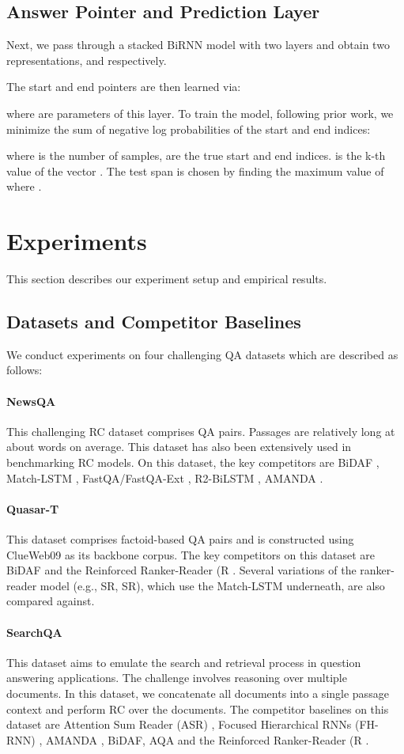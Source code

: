 \documentclass{article}
\begin{document}
\subsection{Answer Pointer and Prediction Layer}
Next, we pass  through a stacked BiRNN model with two layers and obtain two representations,  and  respectively.

The start and end pointers are then learned via:

where  are parameters of this layer.  To train the model, following prior work, we minimize the sum of negative log probabilities of the start and end indices:

where  is the number of samples,  are the true start and end indices.  is the k-th value of the vector . The test span is chosen by finding the maximum value of  where .
\section{Experiments}
This section describes our experiment setup and empirical results.
\subsection{Datasets and Competitor Baselines}
We conduct experiments on four challenging QA datasets which are described as follows:

\paragraph{NewsQA} This challenging RC dataset \citep{trischler2016newsqa}  comprises  QA pairs. Passages are relatively long at about  words on average. This dataset has also been extensively used in benchmarking RC models. On this dataset, the key competitors are BiDAF \citep{seo2016bidirectional}, Match-LSTM \citep{wang2016machine}, FastQA/FastQA-Ext \citep{weissenborn2017making}, R2-BiLSTM \citep{weissenborn2017reading}, AMANDA \citep{kundu2018amanda}.
\paragraph{Quasar-T} This dataset \citep{dhingra2017quasar} comprises  factoid-based QA pairs and is constructed using ClueWeb09 as its backbone corpus. The key competitors on this dataset are BiDAF and the Reinforced Ranker-Reader (R \citep{wang2017r}.
Several variations of the ranker-reader model (e.g., SR, SR), which use the Match-LSTM underneath, are also compared against.
\paragraph{SearchQA} This dataset \citep{dunn2017searchqa} aims to emulate the search and retrieval process in question answering applications. The challenge involves reasoning over multiple documents. In this dataset, we concatenate all documents into a single passage context and perform RC over the documents. The competitor baselines on this dataset are Attention Sum Reader (ASR) \citep{kadlec2016text}, Focused Hierarchical RNNs (FH-RNN) \citep{ke2018focused}, AMANDA \citep{kundu2018amanda}, BiDAF, AQA \citep{buck2017ask} and the Reinforced Ranker-Reader (R \citep{wang2017r}.
\end{document}
